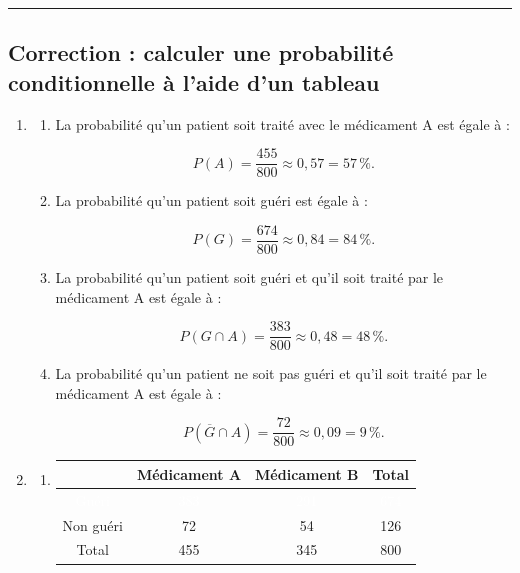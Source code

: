 \documentclass{article}
\theoremstyle{definition}
\begin{document}
\pagestyle{empty}


\large


{
  \normalsize
  \textbf{\Niveau} \hfill \textbf{\Chapitre} \hfill \textbf{\Document}
}
\hrule

\subsection*{Correction : calculer une probabilité conditionnelle à l'aide d'un tableau}

\begin{enumerate}
    \item
    \begin{enumerate}
        \item
        La probabilité qu'un patient soit traité avec le médicament A est égale à :
        
        $$
        P(A) = \frac{455}{800} \approx 0{,}57 = 57\,\%.
        $$

        \item
        La probabilité qu'un patient soit guéri est égale à :
        
        $$
        P(G) = \frac{674}{800} \approx 0{,}84 = 84\,\%.
        $$

        \item
        La probabilité qu'un patient soit guéri et qu'il soit traité par le médicament A est égale à :
        
        $$
        P(G \cap A) = \frac{383}{800} \approx 0{,}48 = 48\,\%.
        $$

        \item
        La probabilité qu'un patient ne soit pas guéri et qu'il soit traité par le médicament A est égale à :
        
        $$
        P(\overline{G} \cap A) = \frac{72}{800} \approx 0{,}09 = 9\,\%.
        $$
    \end{enumerate}

    \item
    \begin{enumerate}
        \item
        \begin{center}
        \begin{tabular}{|c|c|c|c|}
        \hline
        & Médicament A & Médicament B & Total \\
        \hline
        \rowcolor{cyan!70}
        \textcolor{white}{Guéri} & \textcolor{white}{383} & \textcolor{white}{291} & \textcolor{white}{674} \\
        \hline
        Non guéri & 72 & 54 & 126 \\
        \hline
        Total & 455 & 345 & 800 \\
        \hline
        \end{tabular}
        \end{center}


\end{enumerate}
\end{enumerate}
\end{document}
